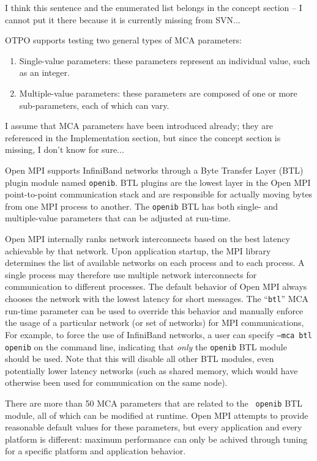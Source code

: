 \label{sec:motivation}

{\Large I think this sentence and the enumerated list belongs in the
  concept section -- I cannot put it there because it is currently
  missing from SVN...}

OTPO supports testing two general types of MCA parameters:

\begin{enumerate}
\item Single-value parameters: these parameters represent an
  individual value, such as an integer.
\item Multiple-value parameters: these parameters are composed of
  one or more sub-parameters, each of which can vary.
\end{enumerate}

{\Large I assume that MCA parameters have been introduced already;
  they are referenced in the Implementation section, but since the
  concept section is missing, I don't know for sure...}

Open MPI supports InfiniBand networks through a Byte Transfer Layer
(BTL) plugin module named {\tt openib}.  BTL plugins are the lowest
layer in the Open MPI point-to-point communication stack and are
responsible for actually moving bytes from one MPI process to
another.  The {\tt openib} BTL has both single- and multiple-value
parameters that can be adjusted at run-time.

Open MPI internally ranks network interconnects based on the best
latency achievable by that network.  Upon application startup, the MPI
library determines the list of available networks on each process and
to each process.  A single process may therefore use multiple network
interconnects for communication to different processes.  The default
behavior of Open MPI always chooses the network with the lowest
latency for short messages.  The ``{\tt btl}'' MCA run-time parameter
can be used to override this behavior and manually enforce the usage
of a particular network (or set of networks) for MPI communications,
For example, to force the use of InfiniBand networks, a user can
specify {\tt --mca btl openib} on the command line, indicating that
{\em only} the {\tt openib} BTL module should be used.  Note that this
will disable all other BTL modules, even potentially lower latency
networks (such as shared memory, which would have otherwise been used
for communication on the same node).

There are more than 50 MCA parameters that are related to the {\tt
  openib} BTL module, all of which can be modified at runtime.  Open
MPI attempts to provide reasonable default values for these
parameters, but every application and every platform is different:
maximum performance can only be achived through tuning for a specific
platform and application behavior.

